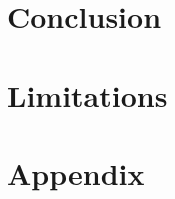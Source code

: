 \documentclass{article}
\begin{document}
\section{Conclusion}

\section*{Limitations}




\appendix

\section{Appendix}
\label{sec:appendix}

\newpage

\end{document}
